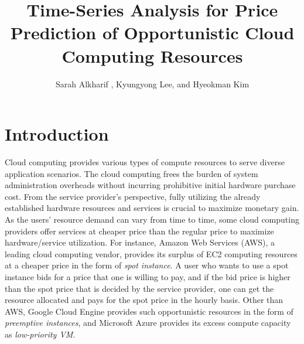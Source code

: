 \documentclass[graybox]{svmult}
\begin{document}
\title*{Time-Series Analysis for Price Prediction of Opportunistic Cloud Computing Resources}
\author{Sarah Alkharif , Kyungyong Lee, and Hyeokman Kim}
%
%
\maketitle


\section{Introduction}\label{sec:1}
Cloud computing provides various types of compute resources to serve diverse application scenarios. The cloud computing frees the burden of system administration overheads without incurring prohibitive initial hardware purchase cost. From the service provider's perspective, fully utilizing the already established hardware resources and services is crucial to maximize monetary gain. As the users' resource demand can vary from time to time, some cloud computing providers offer services at cheaper price than the regular price to maximize hardware/service utilization. For instance, Amazon Web Services (AWS), a leading cloud computing vendor, provides its surplus of EC2 computing resources at a cheaper price in the form of \emph{spot instance}. A user who wants to use a spot instance bids for a price that one is willing to pay, and if the bid price is higher than the spot price that is decided by the service provider, one can get the resource allocated and pays for the spot price in the hourly basis. Other than AWS, Google Cloud Engine provides such opportunistic resources in the form of \emph{preemptive instances}, and Microsoft Azure provides its excess compute capacity as \emph{low-priority VM}.
\end{document}
